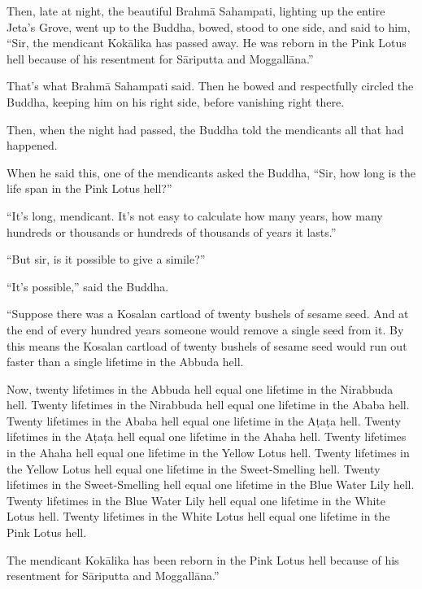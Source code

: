 \documentclass[12pt,openany]{book}%
\begin{document}
Then, late at night, the beautiful \textsanskrit{Brahmā} Sahampati, lighting up the entire Jeta’s Grove, went up to the Buddha, bowed, stood to one side, and said to him, “Sir, the mendicant \textsanskrit{Kokālika} has passed away. He was reborn in the Pink Lotus hell because of his resentment for \textsanskrit{Sāriputta} and \textsanskrit{Moggallāna}.” 

That’s what \textsanskrit{Brahmā} Sahampati said. Then he bowed and respectfully circled the Buddha, keeping him on his right side, before vanishing right there. 

Then, when the night had passed, the Buddha told the mendicants all that had happened. 

When he said this, one of the mendicants asked the Buddha, “Sir, how long is the life span in the Pink Lotus hell?” 

“It’s long, mendicant. It’s not easy to calculate how many years, how many hundreds or thousands or hundreds of thousands of years it lasts.” 

“But sir, is it possible to give a simile?” 

“It’s possible,” said the Buddha. 

“Suppose there was a Kosalan cartload of twenty bushels of sesame seed. And at the end of every hundred years someone would remove a single seed from it. By this means the Kosalan cartload of twenty bushels of sesame seed would run out faster than a single lifetime in the Abbuda hell. 

Now, twenty lifetimes in the Abbuda hell equal one lifetime in the Nirabbuda hell. Twenty lifetimes in the Nirabbuda hell equal one lifetime in the Ababa hell. Twenty lifetimes in the Ababa hell equal one lifetime in the \textsanskrit{Aṭaṭa} hell. Twenty lifetimes in the \textsanskrit{Aṭaṭa} hell equal one lifetime in the Ahaha hell. Twenty lifetimes in the Ahaha hell equal one lifetime in the Yellow Lotus hell. Twenty lifetimes in the Yellow Lotus hell equal one lifetime in the Sweet-Smelling hell. Twenty lifetimes in the Sweet-Smelling hell equal one lifetime in the Blue Water Lily hell. Twenty lifetimes in the Blue Water Lily hell equal one lifetime in the White Lotus hell. Twenty lifetimes in the White Lotus hell equal one lifetime in the Pink Lotus hell. 

The mendicant \textsanskrit{Kokālika} has been reborn in the Pink Lotus hell because of his resentment for \textsanskrit{Sāriputta} and \textsanskrit{Moggallāna}.” 
\end{document}

